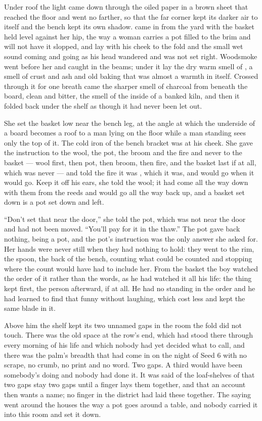 Under  roof the light came down through the oiled paper in a brown sheet that reached the floor and went no farther, so that the far corner kept its darker air to itself and the bench kept its own shadow.  came in from the yard with the basket held level against her hip, the way a woman carries a pot filled to the brim and will not have it slopped, and  lay with his cheek to the fold and the small wet sound coming and going as his head wandered and was not set right. Woodsmoke went before her and caught in the beams; under it lay the dry warm smell of , a smell of crust and ash and old baking that was almost a warmth in itself. Crossed through it for one breath came the sharper smell of charcoal from beneath the board, clean and bitter, the smell of the inside of a banked kiln, and then it folded back under the shelf as though it had never been let out.

She set the basket low near the bench leg, at the angle at which the underside of a board becomes a roof to a man lying on the floor while a man standing sees only the top of it. The cold iron of the bench bracket was at his cheek. She gave the instruction to the wool, the pot, the broom and the fire and never to the basket --- wool first, then pot, then broom, then fire, and the basket last if at all, which was never --- and told the fire it was , which it was, and would go when it would go. Keep it off his ears, she told the wool; it had come all the way down with them from the reeds and would go all the way back up, and a basket set down is a pot set down and left.

“Don't set that near the door,” she told the pot, which was not near the door and had not been moved. “You'll pay for it in the thaw.” The pot gave back nothing, being a pot, and the pot's instruction was the only answer she asked for. Her hands were never still when they had nothing to hold: they went to the rim, the spoon, the back of the bench, counting what could be counted and stopping where the count would have had to include her. From the basket the boy watched the order of it rather than the words, as he had watched it all his life: the thing kept first, the person afterward, if at all. He had no standing in the order and he had learned to find that funny without laughing, which cost less and kept the same blade in it.

Above him the shelf kept its two unnamed gaps in the room the fold did not touch. There was the old space at the row's end, which had stood there through every morning of his life and which nobody had yet decided what to call, and there was the palm's breadth that had come in on the night of Seed 6 with no scrape, no crumb, no print and no word. Two gaps. A third would have been somebody's doing and nobody had done it. It was said of the loaf-shelves of  that two gaps stay two gaps until a finger lays them together, and that an account then wants a name; no finger in the district had laid these together. The saying went around the houses the way a pot goes around a table, and nobody carried it into this room and set it down.

